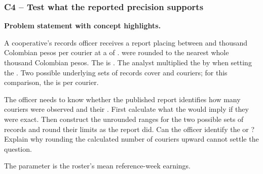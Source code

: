 \subsubsection*{C4 -- Test what the reported precision supports}\label{sol:c4-advanced-2}
\textbf{Problem statement with concept highlights.}
\begingroup\raggedright
A cooperative's records officer receives a report placing    between  and  thousand Colombian pesos per courier at a  of .  were rounded to the nearest whole thousand Colombian pesos. The   is  . The analyst multiplied the   by  when setting the   . Two possible underlying sets of records cover  and  couriers; for this comparison, the   is   per courier.

The officer needs to know whether the published report identifies how many couriers were observed and their . First calculate what the  would imply if they were exact. Then construct the unrounded ranges for the two possible sets of records and round their limits as the report did. Can the officer identify the   or ? Explain why rounding the calculated number of couriers upward cannot settle the question.
\par\endgroup

The parameter is the roster's mean reference-week earnings. 


